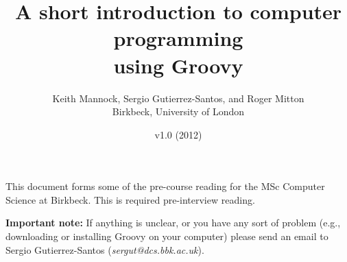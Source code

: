 \documentclass[11pt,a4paper]{article}
\title{A short introduction to computer programming\\using Groovy}
\author{Keith Mannock, Sergio Gutierrez-Santos, and Roger Mitton\\
Birkbeck, University of London}
\date{v1.0 (2012)}
\begin{document}
\maketitle



\noindent This document forms some of the pre-course reading for the
MSc Computer Science at Birkbeck. This is required pre-interview reading. 

\textbf{Important note: }If anything is unclear, or you have any sort of problem (e.g.,
downloading or installing Groovy on your computer) please send an
email to Sergio Gutierrez-Santos (\emph{sergut@dcs.bbk.ac.uk}).



%

%

%



\end{document}
